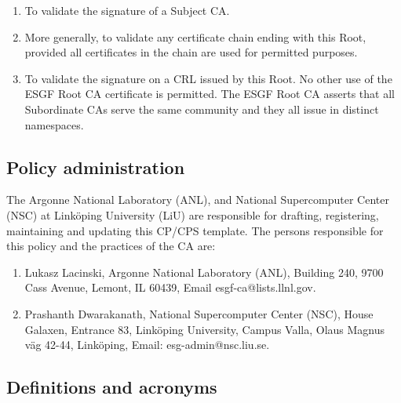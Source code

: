 \begin{enumerate}
\item
  
  To validate the signature of a Subject CA.
  
\item
  
  More generally, to validate any certificate chain ending with this
  Root, provided all certificates in the chain are used for permitted
  purposes.
  
\item
  
  To validate the signature on a CRL issued by this Root. No other use
  of the ESGF Root CA certificate is permitted. The ESGF Root CA
  asserts that all Subordinate CAs serve the same community and they all
  issue in distinct namespaces.
  
\end{enumerate}

\subsection{Policy administration}\label{policy-administration}

The Argonne National Laboratory (ANL), and National Supercomputer Center (NSC) at Link\"oping University (LiU) are responsible for drafting,
registering, maintaining and updating this CP/CPS template. The persons
responsible for this policy and the practices of the CA are: 
\begin{enumerate}
\item Lukasz Lacinski, Argonne National Laboratory (ANL), Building 240, 9700 Cass Avenue, Lemont, IL 60439, Email esgf-ca@lists.llnl.gov.
\item Prashanth Dwarakanath, National Supercomputer Center (NSC), House Galaxen, Entrance 83, Link\"oping University, Campus Valla, Olaus Magnus v\"ag 42-44, Link\"oping, Email: esg-admin@nsc.liu.se.
\end{enumerate}

\subsection{Definitions and acronyms}\label{definitions-and-acronyms}

